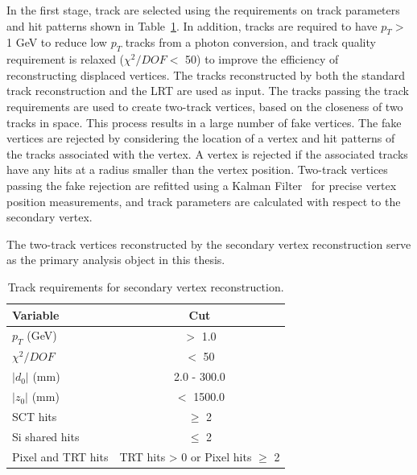 In the first stage, track are selected using the requirements on track parameters and hit patterns shown in Table~\ref{table:vertex_track_selection_simple}. In addition, tracks are required to have $p_{T} >$ 1 GeV to reduce low $p_{T}$ tracks from a photon conversion, and track quality requirement is relaxed ($\chi^{2} / DOF < $ 50) to improve the efficiency of reconstructing displaced vertices. The tracks reconstructed by both the standard track reconstruction and the LRT are used as input. The tracks passing the track requirements are used to create two-track vertices, based on the closeness of two tracks in space. This process results in a large number of fake vertices. The fake vertices are rejected by considering the location of a vertex and hit patterns of the tracks associated with the vertex. A vertex is rejected if the associated tracks have any hits at a radius smaller than the vertex position. Two-track vertices passing the fake rejection are refitted using a Kalman Filter~\cite{Kalman:434680} for precise vertex position measurements, and track parameters are calculated with respect to the secondary vertex.

The two-track vertices reconstructed by the secondary vertex reconstruction serve as the primary analysis object in this thesis. %







\begin{table}[!htb]
  \centering
  \begin{tabular}{ l c }
    \hline
    \hline
	Variable      		& Cut                                         	\\
    \hline
	$p_{T}$ (GeV)		& $>$ 1.0										\\
	$\chi^{2} / DOF$	& $<$ 50  										\\
	$|d_{0}|$	(mm)		& 2.0 - 300.0									\\
	$|z_{0}|$ (mm)		& $<$ 1500.0									\\
	SCT hits			& $\geq$ 2										\\
	Si shared hits	    & $\leq$ 2										\\
	Pixel and TRT hits  & TRT hits > 0 or Pixel hits $\geq$ 2			\\
    \hline
    \hline
  \end{tabular}
  \caption{Track requirements for secondary vertex reconstruction.}
  \label{table:vertex_track_selection_simple}
\end{table}


